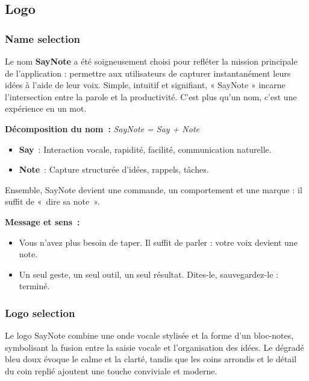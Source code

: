 


\subsection{Logo}
\subsubsection{Name selection}
\begin{tcolorbox}[colback=SayNoteLightGray!10!white, title=Origine du nom]
Le nom \textbf{SayNote} a été soigneusement choisi pour refléter la mission principale de l'application : permettre aux utilisateurs de capturer instantanément leurs idées à l’aide de leur voix. Simple, intuitif et signifiant, « SayNote » incarne l’intersection entre la parole et la productivité. C’est plus qu’un nom, c’est une expérience en un mot.
\end{tcolorbox}

\textbf{Décomposition du nom~:} \textit{SayNote = Say + Note}
\begin{itemize}
    \item \textbf{Say}~: Interaction vocale, rapidité, facilité, communication naturelle.
    \item \textbf{Note}~: Capture structurée d’idées, rappels, tâches.
\end{itemize}

\noindent
Ensemble, SayNote devient une commande, un comportement et une marque : il suffit de «~dire sa note~».

\textbf{Message et sens~:}
\begin{itemize}
    \item Vous n’avez plus besoin de taper. Il suffit de parler : votre voix devient une note.
    \item Un seul geste, un seul outil, un seul résultat. Dites-le, sauvegardez-le : terminé.
\end{itemize}

\subsubsection{Logo selection}
Le logo SayNote combine une onde vocale stylisée et la forme d’un bloc-notes, symbolisant la fusion entre la saisie vocale et l’organisation des idées. Le dégradé bleu doux évoque le calme et la clarté, tandis que les coins arrondis et le détail du coin replié ajoutent une touche conviviale et moderne.

